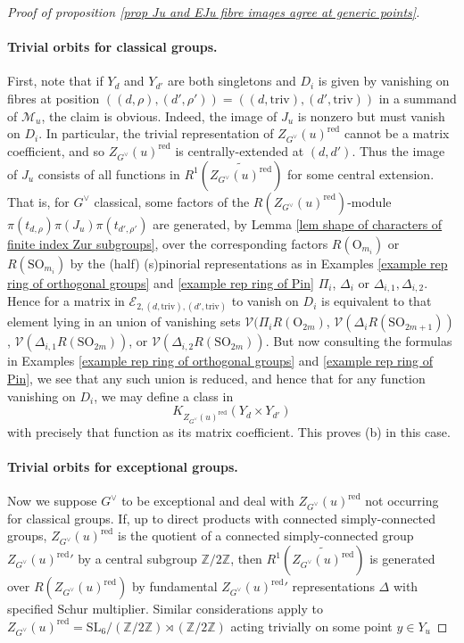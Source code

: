\documentclass[10pt]{article}
\newcommand{\Ee}{\mathcal{E}}
\newcommand{\Z}{\mathbb{Z}}
\newcommand{\SL}{\mathrm{SL}}
\newcommand{\SO}{\mathrm{SO}}
\newcommand{\OO}{\mathrm{O}}
\newcommand{\triv}{\mathrm{triv}}
\theoremstyle{definition}
\theoremstyle{remark}
\newcommand{\Gd}{G^\vee}
\newcommand{\Pin}{\mathrm{Pin}}
\newcommand{\Zur}{Z_{G^\vee}(u)^{\mathrm{red}}}
\newcommand{\mMu}{\mathcal{M}_u}
\begin{document}
\begin{proof}[Proof of proposition \ref{prop Ju and EJu fibre images agree at generic points}]
\paragraph{Trivial orbits for classical groups.}
First, note that if $Y_d$ and $Y_{d'}$ are both singletons
and $D_i$ is given by vanishing on fibres at position $((d,\rho),(d',\rho'))=((d,\triv),(d',\triv))$
in a summand of $\mMu$, the claim is obvious. Indeed, the image of $J_u$ is nonzero but must vanish on $D_i$.
In particular, the trivial representation of $\Zur$ cannot be a matrix coefficient, and so 
$\Zur$ is centrally-extended at $(d,d')$. Thus the image of $J_u$ consists of all functions
in $R^1(\widetilde{\Zur})$ for some central extension. That is, 
for $\Gd$ classical, some 
factors of the $R\left(\Zur\right)$-module $\pi(t_{d,\rho})\pi(J_u)\pi(t_{d',\rho'})$
are generated, by Lemma \ref{lem shape of characters of finite index Zur subgroups}, over the corresponding factors $R(\OO_{m_i})$ or $R(\SO_{m_i})$ by the (half) (s)pinorial representations as in Examples \ref{example rep ring of orthogonal groups} and \ref{example rep ring of Pin}
$\Pi_i$, $\Delta_i$ or $\Delta_{i,1},\Delta_{i,2}$. Hence for a matrix in $\Ee_{2,(d,\triv),(d',\triv)}$ to vanish on $D_i$
is equivalent to that element lying in  
an union of vanishing sets $\mathcal{V}(\Pi_iR(\OO_{2m})$, $\mathcal{V}(\Delta_i R(\SO_{2m+1}))$, 
$\mathcal{V}(\Delta_{i,1}R(\SO_{2m}))$, or $\mathcal{V}(\Delta_{i,2}R(\SO_{2m}))$. But now consulting the 
formulas in Examples \ref{example rep ring of orthogonal groups} and \ref{example rep ring of Pin}, we see that any such union is reduced, and hence that for
any function vanishing on $D_i$, we may define a class in
%
\[
K_{\Zur}(Y_{d}\times Y_{d'})
\]
%
with precisely that function as its matrix coefficient. This proves (b) in this case.

\paragraph{Trivial orbits for exceptional groups.}
Now we suppose $\Gd$ to be exceptional and deal with $\Zur$ not occurring for classical 
groups. If, up to direct products with connected simply-connected groups,
$\Zur$ is the quotient of a connected simply-connected group ${\Zur}'$ by a central subgroup $\Z/2\Z$, then
$R^1(\widetilde{\Zur})$ is generated over $R(\Zur)$ by fundamental ${\Zur}'$ representations
$\Delta$ with specified Schur multiplier. Similar considerations apply to $\Zur=\SL_6/(\Z/2\Z)\rtimes(\Z/2\Z)$ acting trivially on some point $y\in Y_u$


\end{proof}
\end{document}
